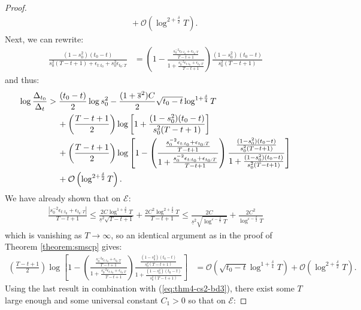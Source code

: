 \begin{proof}
\begin{align*}
    &\quad\: + \mathcal{O}\left(\log^{2+\frac{\delta}{2}} T\right). 
\end{align*}
Next, we can rewrite:
\begin{align*}
    \frac{(1 - s_0^2)(t_0 - t)}{s_0^{2}(T-t+1) + \epsilon_{t:t_0} + s_0^{2}\epsilon_{t_0:T}} &= \left(1 - \frac{\frac{s_0^{-2}\epsilon_{t:t_0} + \epsilon_{t_0:T}}{T-t+1}}{1 + \frac{s_0^{-2}\epsilon_{t:t_0} + \epsilon_{t_0:T}}{T-t+1}}\right)\frac{(1 - s_0^2)(t_0 - t)}{s_0^{2}(T-t+1)}
\end{align*}
and thus:
\begin{align}
    \log \frac{\Delta_{t_0}}{\Delta_t} &> \frac{(t_0-t)}{2}\log s_0^2 - \frac{(1  +\overline{s}^2)C}{2}\sqrt{t_0-t}\log^{1+\frac{\delta}{4}}T \notag \\
    &\quad\: + \left(\frac{T - t +1}{2}\right)\log\left[1 + \frac{(1 - s_0^2)(t_0 - t)}{s_0^{2}(T-t+1)}\right] \notag \\
    &\quad\: + \left(\frac{T - t +1}{2}\right)\log\left[1 - \left(\frac{\frac{s_0^{-2}\epsilon_{t:t_0} + \epsilon_{t_0:T}}{T-t+1}}{1 + \frac{s_0^{-2}\epsilon_{t:t_0} + \epsilon_{t_0:T}}{T-t+1}}\right)\frac{\frac{(1 - s_0^2)(t_0 - t)}{s_0^{2}(T-t+1)}}{1 + \frac{(1 - s_0^2)(t_0 - t)}{s_0^{2}(T-t+1)}}\right]  \notag \\
    &\quad\: + \mathcal{O}\left(\log^{2+\frac{\delta}{2}} T\right). \label{eq:thm4-cs2-bd3}
\end{align}
We have already shown that on $\mathcal{E}$: 
\begin{align*}
    \frac{|s_0^{-2} \epsilon_{t:t_0} + \epsilon_{t_0:T}|}{T-t+1} \leq  \frac{2C\log^{1+\frac{\delta}{4}} T}{\underline{s}^{2}\sqrt{T-t+1}} + \frac{2C^2\log^{2+\frac{\delta}{2}} T}{T-t+1} \leq \frac{2C}{\underline{s}^{2}\sqrt{\log^{\varepsilon - \frac{\delta}{2}}T}} + \frac{2C^2}{\log^{\varepsilon-\frac{\delta}{2}} T} 
\end{align*}
which is vanishing as $T\to \infty$, so an identical argument as in the proof of Theorem \ref{theorem:smscp} gives:
\small
\begin{align*}
    \left(\frac{T - t +1}{2}\right)\log\left[1 - \left(\frac{\frac{s_0^{-2}\epsilon_{t:t_0} + \epsilon_{t_0:T}}{T-t+1}}{1 + \frac{s_0^{-2}\epsilon_{t:t_0} + \epsilon_{t_0:T}}{T-t+1}}\right)\frac{\frac{(1 - s_0^2)(t_0 - t)}{s_0^{2}(T-t+1)}}{1 + \frac{(1 - s_0^2)(t_0 - t)}{s_0^{2}(T-t+1)}}\right] &= \mathcal{O}\left(\sqrt{t_0-t}\log^{1+\frac{\delta}{4}} T\right) + \mathcal{O}\left(\log^{2+\frac{\delta}{2}} T\right).
\end{align*}
\normalsize
Using the last result in combination with (\ref{eq:thm4-cs2-bd3}), there exist some $T$ large enough and some universal constant $C_1 > 0$ so that on $\mathcal{E}$: 

\end{proof}
